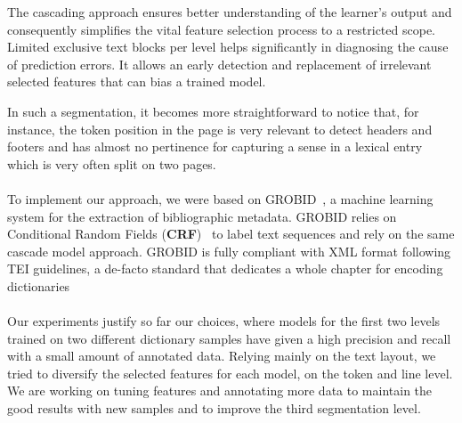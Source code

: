\documentclass[twocolumn,a4paper]{article}
\begin{document}
 The cascading approach ensures better understanding of the learner’s output and consequently simplifies the vital feature selection process to a restricted scope. Limited exclusive text blocks per level helps significantly in diagnosing the cause of prediction errors. It allows an early detection and replacement of irrelevant selected features that can bias a trained model.
					
In such a segmentation, it becomes more straightforward to notice that, for instance, the token position in the page is very relevant to detect headers and footers and has almost no pertinence for capturing a sense in a lexical entry which is very often split on two pages.
  




\paragraph{}To implement our approach, we were based on GROBID~\cite{Lopez2015GROBIDI}, a machine learning system for the extraction of bibliographic metadata. GROBID relies on Conditional Random Fields (\textbf{CRF})~\cite{lavergne2010practical} to label text sequences and rely on the same cascade model approach. GROBID is fully compliant with XML format following TEI guidelines, a de-facto standard that dedicates a whole chapter for encoding dictionaries~\cite{budin2012creating}
 
\paragraph{}Our experiments justify so far our choices, where models for the first two levels trained on two different dictionary samples have given a high precision and recall with a small amount of annotated data. Relying mainly on the text layout, we tried to diversify the selected features for each model, on the token and line level. We are working on tuning features and annotating more data to maintain the good results with new samples and to improve the third segmentation level.

 
\end{document}
